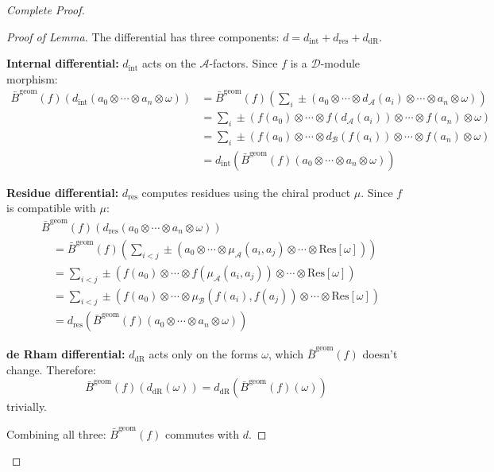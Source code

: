 \begin{proof}[Complete Proof]
\begin{proof}[Proof of Lemma]
The differential has three components: $d = d_{\text{int}} + d_{\text{res}} + d_{\text{dR}}$.

\textbf{Internal differential:} $d_{\text{int}}$ acts on the $\mathcal{A}$-factors. Since $f$ is a $\mathcal{D}$-module morphism:
\begin{align*}
\bar{B}^{\text{geom}}(f)(d_{\text{int}}(a_0 \otimes \cdots \otimes a_n \otimes \omega))
&= \bar{B}^{\text{geom}}(f)\left(\sum_i \pm (a_0 \otimes \cdots \otimes d_{\mathcal{A}}(a_i) \otimes \cdots \otimes a_n \otimes \omega)\right) \\
&= \sum_i \pm (f(a_0) \otimes \cdots \otimes f(d_{\mathcal{A}}(a_i)) \otimes \cdots \otimes f(a_n) \otimes \omega) \\
&= \sum_i \pm (f(a_0) \otimes \cdots \otimes d_{\mathcal{B}}(f(a_i)) \otimes \cdots \otimes f(a_n) \otimes \omega) \\
&= d_{\text{int}}(\bar{B}^{\text{geom}}(f)(a_0 \otimes \cdots \otimes a_n \otimes \omega))
\end{align*}

\textbf{Residue differential:} $d_{\text{res}}$ computes residues using the chiral product $\mu$. Since $f$ is compatible with $\mu$:
\begin{align*}
&\bar{B}^{\text{geom}}(f)(d_{\text{res}}(a_0 \otimes \cdots \otimes a_n \otimes \omega)) \\
&\quad = \bar{B}^{\text{geom}}(f)\left(\sum_{i<j} \pm (a_0 \otimes \cdots \otimes \mu_\mathcal{A}(a_i, a_j) \otimes \cdots \otimes \text{Res}[\omega])\right) \\
&\quad = \sum_{i<j} \pm (f(a_0) \otimes \cdots \otimes f(\mu_\mathcal{A}(a_i, a_j)) \otimes \cdots \otimes \text{Res}[\omega]) \\
&\quad = \sum_{i<j} \pm (f(a_0) \otimes \cdots \otimes \mu_\mathcal{B}(f(a_i), f(a_j)) \otimes \cdots \otimes \text{Res}[\omega]) \\
&\quad = d_{\text{res}}(\bar{B}^{\text{geom}}(f)(a_0 \otimes \cdots \otimes a_n \otimes \omega))
\end{align*}

\textbf{de Rham differential:} $d_{\text{dR}}$ acts only on the forms $\omega$, which $\bar{B}^{\text{geom}}(f)$ doesn't change. Therefore:
$$\bar{B}^{\text{geom}}(f)(d_{\text{dR}}(\omega)) = d_{\text{dR}}(\bar{B}^{\text{geom}}(f)(\omega))$$
trivially.

Combining all three: $\bar{B}^{\text{geom}}(f)$ commutes with $d$. \qedhere
\end{proof}


\end{proof}
